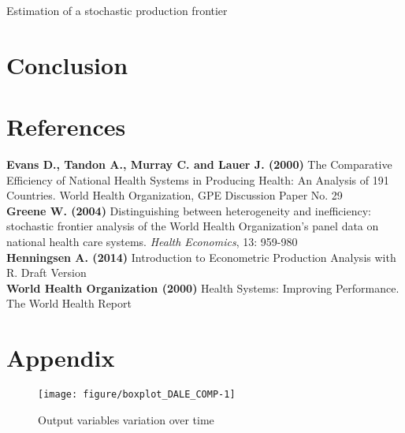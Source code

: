 \documentclass[12pt,a4paper]{article}\usepackage[]{graphicx}\usepackage[]{color}
\newenvironment{knitrout}{}{} %
\begin{document}











Estimation of a stochastic production frontier




\section{Conclusion}



\newpage
\section{References}
\textbf{Evans D., Tandon A., Murray C. and Lauer J. (2000)} The Comparative Efficiency of National Health Systems in Producing Health: An Analysis of 191 Countries. World Health Organization, GPE Discussion Paper No. 29 \\

\textbf{Greene W. (2004)} Distinguishing between heterogeneity and inefficiency: stochastic frontier analysis of the World Health Organization's panel data on national health care systems. \textit{Health Economics}, 13: 959-980 \\

\textbf{Henningsen A. (2014)} Introduction to Econometric Production Analysis with R. Draft Version \\

\textbf{World Health Organization (2000)} Health Systems: Improving Performance. The World Health Report



\newpage
\section{Appendix}


\begin{knitrout}
\color{fgcolor}\begin{figure}[htbp]

{\centering \texttt{[image: figure/boxplot\_DALE\_COMP-1]} 

}

\caption[Output variables variation over time]{Output variables variation over time}\label{fig:boxplot_DALE_COMP}
\end{figure}


\end{knitrout}
\end{document}
